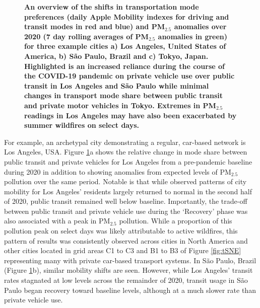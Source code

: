\documentclass[preprint,10pt]{elsarticle} %
\begin{document}
\begin{figure}
         \label{fig:Tokyo}
        \caption{\bf An overview of the shifts in transportation mode preferences (daily Apple Mobility indexes for driving and transit modes in red and blue) and PM$_{2.5}$ anomalies over 2020 (7 day rolling averages of PM$_{2.5}$ anomalies in green) for three example cities a) Los Angeles, United States of America, b) S\~ao Paulo, Brazil and c) Tokyo, Japan. Highlighted is an increased reliance during the course of the COVID-19 pandemic on private vehicle use over public transit in Los Angeles and S\~ao Paulo while minimal changes in transport mode share between public transit and private motor vehicles in Tokyo. Extremes in PM$_{2.5}$ readings in Los Angeles may have also been exacerbated by summer wildfires on select days.}
        \label{fig:three_graphs_Driv_trans}
\end{figure}

For example, an archetypal city demonstrating a regular, car-based network is Los Angeles, USA. Figure \ref{fig:three_graphs_Driv_trans}a shows the relative change in mode share between public transit and private vehicles for Los Angeles from a pre-pandemic baseline during 2020 in addition to showing anomalies from expected levels of PM$_{2.5}$ pollution over the same period. Notable is that while observed patterns of city mobility for Los Angeles' residents largely returned to normal in the second half of 2020, public transit remained well below baseline. Importantly, the trade-off between public transit and private vehicle use during the `Recovery' phase was also associated with a peak in PM$_{2.5}$ pollution. While a proportion of this pollution peak on select days was likely attributable to active wildfires, this pattern of results was consistently observed across cities in North America and other cities located in grid areas C1 to C3 and B1 to B3 of Figure \ref{fig:tSNE} representing many with private car-based transport systems. In S\~ao Paulo, Brazil (Figure \ref{fig:three_graphs_Driv_trans}b), similar mobility shifts are seen. However, while Los Angeles' transit rates stagnated at low levels across the remainder of 2020, transit usage in S\~ao Paulo began recovery toward baseline levels, although at a much slower rate than private vehicle use.
\end{document}
